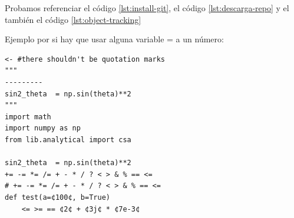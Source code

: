 Probamos referenciar el código \ref{lst:install-git}, el código \ref{lst:descarga-repo} y el también el código \ref{lst:object-tracking}

Ejemplo por si hay que usar alguna variable = a un número:

\begin{lstlisting}[language=iPython]
<- #there shouldn't be quotation marks
"""
---------
sin2_theta  = np.sin(theta)**2
"""
import math
import numpy as np
from lib.analytical import csa

sin2_theta  = np.sin(theta)**2
+= -= *= /= + - * / ? < > & % == <=
# += -= *= /= + - * / ? < > & % == <=
def test(a=¢100¢, b=True)
    <= >= == ¢2¢ + ¢3j¢ * ¢7e-3¢
\end{lstlisting}
